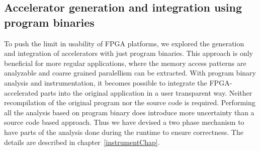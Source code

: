 \subsection{Accelerator generation and integration using program binaries}
To push the limit in usability of FPGA platforms, we explored the generation and 
integration of accelerators with just program binaries. 
This approach is only beneficial for more regular applications,
where the memory access patterns are analyzable and coarse grained paralellism can be extracted.
With program binary analysis and instrumentation, it becomes possible to integrate the FPGA-accelerated parts into the original application
in a user transparent way. Neither recompilation of the original program nor the source code
is required. Performing all the analysis based on program binary does introduce more uncertainty
than a source code based approach. Thus we have devised a two phase mechanism to have parts of the 
analysis done during the runtime to ensure correctness. The details are described
in chapter~\ref{instrumentChap}. 

